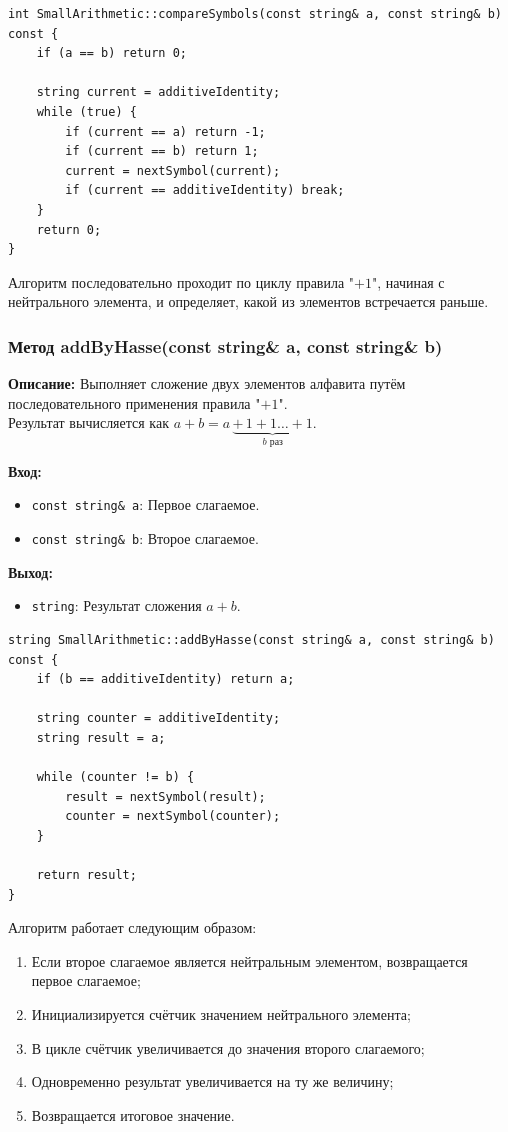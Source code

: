 \begin{lstlisting}[style=cstyle, caption={Реализация compareSymbols()}]
int SmallArithmetic::compareSymbols(const string& a, const string& b) const {
    if (a == b) return 0;

    string current = additiveIdentity;
    while (true) {
        if (current == a) return -1;
        if (current == b) return 1;
        current = nextSymbol(current);
        if (current == additiveIdentity) break;
    }
    return 0;
}
\end{lstlisting}

Алгоритм последовательно проходит по циклу правила "$+1$", начиная с нейтрального элемента, и определяет, какой из элементов встречается раньше.

\subsubsection{Метод addByHasse(const string\& a, const string\& b)}

\textbf{Описание:} Выполняет сложение двух элементов алфавита путём последовательного применения правила "$+1$".  \\ Результат вычисляется как $a + b = a \, \underbrace{+ \,1 +1 \ldots +1}_{b \text{ раз}}$. 

\textbf{Вход:}
\begin{itemize}
    \item \texttt{const string\& a}:  Первое слагаемое.
    \item \texttt{const string\& b}: Второе слагаемое.
\end{itemize}

\textbf{Выход:}
\begin{itemize}
    \item \texttt{string}:  Результат сложения $a + b$.
\end{itemize}

\begin{lstlisting}[style=cstyle, caption={Реализация addByHasse()}]
string SmallArithmetic::addByHasse(const string& a, const string& b) const {
    if (b == additiveIdentity) return a;

    string counter = additiveIdentity;
    string result = a;

    while (counter != b) {
        result = nextSymbol(result);
        counter = nextSymbol(counter);
    }

    return result;
}
\end{lstlisting}

Алгоритм работает следующим образом:
\begin{enumerate}
    \item Если второе слагаемое является нейтральным элементом, возвращается первое слагаемое;
    \item Инициализируется счётчик значением нейтрального элемента;
    \item В цикле счётчик увеличивается до значения второго слагаемого;
    \item Одновременно результат увеличивается на ту же величину;
    \item Возвращается итоговое значение.
\end{enumerate}

